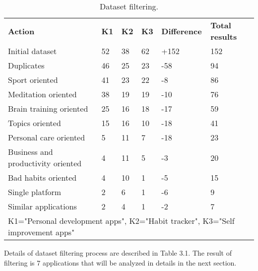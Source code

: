 \begin{table}
    \centering
    \begin{adjustbox}{width=\textwidth + 1}
        \begin{ctucolortab}
            \begin{tabular}{llllll}
                \bfseries Action & \bfseries K1 & \bfseries K2 & \bfseries K3 & \bfseries Difference & \bfseries Total results \\\Midrule
                Initial dataset & 52 & 38 & 62 & +152 & 152\\
                Duplicates & 46 & 25 & 23 & -58 & 94\\
                Sport oriented & 41 & 23 & 22 & -8 & 86\\
                Meditation oriented & 38 & 19 & 19 & -10 & 76\\
                Brain training oriented & 25 & 16 & 18 & -17 & 59\\
                Topics oriented & 15 & 16 & 10 & -18 & 41\\
                Personal care oriented & 5 & 11 & 7 & -18 & 23\\
                Business and productivity oriented & 4 & 11 & 5 & -3 & 20\\
                Bad habits oriented & 4 & 10 & 1 & -5 & 15\\
                Single platform & 2 & 6 & 1 & -6 & 9\\
                Similar applications & 2 & 4 & 1 & -2 & 7\\
                \bottomrule
                \multicolumn{6}{1}{K1="Personal development apps", K2="Habit tracker", K3="Self improvement apps"}
            \end{tabular}
        \end{ctucolortab}
    \end{adjustbox}
    \caption{Dataset filtering.}
    \label{tab:dataset-filtering}
\end{table}

Details of dataset filtering process are described in Table 3.1.
The result of filtering is 7 applications that will be analyzed in details in the next section.
